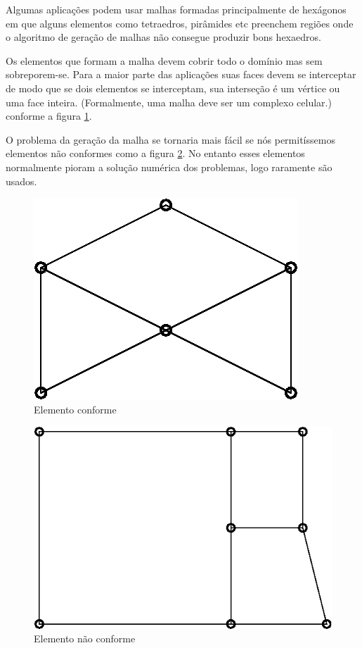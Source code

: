 Algumas aplicações podem usar malhas formadas principalmente de hexágonos em que alguns elementos como tetraedros, pirâmides etc preenchem regiões onde o algoritmo de geração de malhas não consegue produzir bons hexaedros.

Os elementos que formam a malha devem cobrir todo o domínio mas sem sobreporem-se. Para a maior parte das aplicações suas faces devem se interceptar de modo que se dois elementos se interceptam, sua interseção é um vértice ou uma face inteira. (Formalmente, uma malha deve ser um complexo celular.) conforme a figura \ref{fig:celula_correta}.

O problema da geração da malha se tornaria mais fácil se nós permitíssemos elementos não conformes como a figura \ref{fig:celula_errada}. No entanto esses elementos normalmente pioram a solução numérica dos problemas, logo raramente são usados.

\begin{figure}
    \centering
    \includegraphics{fig/celula_correta.eps}
    \caption[Elemento conforme]{Elemento conforme}
    \label{fig:celula_correta}
\end{figure}


\begin{figure}
    \centering
    \includegraphics{fig/celula_errada.eps}
    \caption[Elemento não conforme]{Elemento não conforme}
    \label{fig:celula_errada}
\end{figure}

